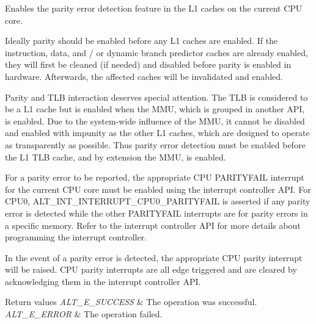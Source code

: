 Enables the parity error detection feature in the L1 caches on the current C\+PU core.

Ideally parity should be enabled before any L1 caches are enabled. If the instruction, data, and / or dynamic branch predictor caches are already enabled, they will first be cleaned (if needed) and disabled before parity is enabled in hardware. Afterwards, the affected caches will be invalidated and enabled.

Parity and T\+LB interaction deserves special attention. The T\+LB is considered to be a L1 cache but is enabled when the M\+MU, which is grouped in another A\+PI, is enabled. Due to the system-\/wide influence of the M\+MU, it cannot be disabled and enabled with impunity as the other L1 caches, which are designed to operate as transparently as possible. Thus parity error detection must be enabled before the L1 T\+LB cache, and by extension the M\+MU, is enabled.

For a parity error to be reported, the appropriate C\+PU P\+A\+R\+I\+T\+Y\+F\+A\+IL interrupt for the current C\+PU core must be enabled using the interrupt controller A\+PI. For C\+P\+U0, A\+L\+T\+\_\+\+I\+N\+T\+\_\+\+I\+N\+T\+E\+R\+R\+U\+P\+T\+\_\+\+C\+P\+U0\+\_\+\+P\+A\+R\+I\+T\+Y\+F\+A\+IL is asserted if any parity error is detected while the other P\+A\+R\+I\+T\+Y\+F\+A\+IL interrupts are for parity errors in a specific memory. Refer to the interrupt controller A\+PI for more details about programming the interrupt controller.

In the event of a parity error is detected, the appropriate C\+PU parity interrupt will be raised. C\+PU parity interrupts are all edge triggered and are cleared by acknowledging them in the interrupt controller A\+PI.


\begin{DoxyRetVals}{Return values}
{\em A\+L\+T\+\_\+\+E\+\_\+\+S\+U\+C\+C\+E\+SS} & The operation was successful. \\
\hline
{\em A\+L\+T\+\_\+\+E\+\_\+\+E\+R\+R\+OR} & The operation failed. \\
\hline
\end{DoxyRetVals}
\mbox{\label{group__CACHE__L1_gac40b8b1929d205fcaf4b213db7c80454}} 
